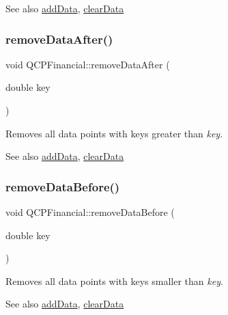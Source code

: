 \begin{DoxySeeAlso}{See also}
\hyperlink{class_q_c_p_financial_a1a83396f97fcc68f2b7aa8d9782feffe}{add\+Data}, \hyperlink{class_q_c_p_financial_a11fd49928c33e55e27b7319c6927864a}{clear\+Data} 
\end{DoxySeeAlso}
\hypertarget{class_q_c_p_financial_aa0fcd357005288c833a230c7874825ba}{}\label{class_q_c_p_financial_aa0fcd357005288c833a230c7874825ba} 
\subsubsection{\texorpdfstring{remove\+Data\+After()}{removeDataAfter()}}
{\footnotesize\ttfamily void Q\+C\+P\+Financial\+::remove\+Data\+After (\begin{DoxyParamCaption}\item[{double}]{key }\end{DoxyParamCaption})}

Removes all data points with keys greater than {\itshape key}.

\begin{DoxySeeAlso}{See also}
\hyperlink{class_q_c_p_financial_a1a83396f97fcc68f2b7aa8d9782feffe}{add\+Data}, \hyperlink{class_q_c_p_financial_a11fd49928c33e55e27b7319c6927864a}{clear\+Data} 
\end{DoxySeeAlso}
\hypertarget{class_q_c_p_financial_a097c0383c7c1e9042ca7f93cb439d15a}{}\label{class_q_c_p_financial_a097c0383c7c1e9042ca7f93cb439d15a} 
\subsubsection{\texorpdfstring{remove\+Data\+Before()}{removeDataBefore()}}
{\footnotesize\ttfamily void Q\+C\+P\+Financial\+::remove\+Data\+Before (\begin{DoxyParamCaption}\item[{double}]{key }\end{DoxyParamCaption})}

Removes all data points with keys smaller than {\itshape key}.

\begin{DoxySeeAlso}{See also}
\hyperlink{class_q_c_p_financial_a1a83396f97fcc68f2b7aa8d9782feffe}{add\+Data}, \hyperlink{class_q_c_p_financial_a11fd49928c33e55e27b7319c6927864a}{clear\+Data} 
\end{DoxySeeAlso}
\hypertarget{class_q_c_p_financial_a77bffad8f3fcbcccbef03ead1c538e3a}{}\label{class_q_c_p_financial_a77bffad8f3fcbcccbef03ead1c538e3a} 
